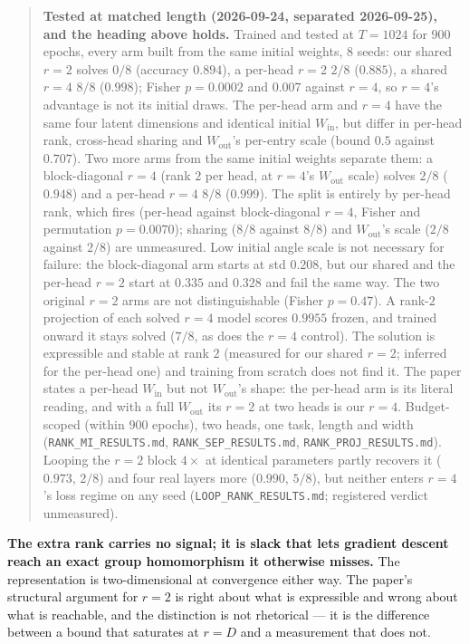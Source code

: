 \documentclass[11pt]{article}
\begin{document}
\begin{quote}\small
\textbf{Tested at matched length (2026-09-24, separated 2026-09-25), and the heading above holds.} Trained
and tested at $T=1024$ for $900$ epochs, every arm built from the same initial
weights, $8$ seeds: our shared $r=2$ solves $0/8$ (accuracy $0.894$), a
per-head $r=2$ $2/8$ ($0.885$), a shared $r=4$ $8/8$ ($0.998$); Fisher $p=0.0002$ and
$0.007$ against $r=4$, so $r=4$'s advantage is not its initial draws. The per-head arm
and $r=4$ have the same four latent dimensions and identical initial
$W_{\mathrm{in}}$, but differ in per-head rank, cross-head sharing and
$W_{\mathrm{out}}$'s per-entry scale (bound $0.5$ against $0.707$). Two more arms from
the same initial weights separate them: a block-diagonal $r=4$ (rank $2$ per head, at
$r=4$'s $W_{\mathrm{out}}$ scale) solves $2/8$ ($0.948$) and a per-head $r=4$ $8/8$
($0.999$). The split is entirely by per-head rank, which fires (per-head against
block-diagonal $r=4$, Fisher and permutation $p=0.0070$); sharing ($8/8$ against $8/8$)
and $W_{\mathrm{out}}$'s scale ($2/8$ against $2/8$) are unmeasured. Low initial angle
scale is not necessary for failure: the block-diagonal arm starts at std $0.208$, but our
shared and the per-head $r=2$ start at $0.335$ and $0.328$ and fail the same way. The two
original $r=2$ arms are not distinguishable (Fisher $p=0.47$). A rank-$2$ projection of each solved $r=4$ model scores $0.9955$ frozen,
and trained onward it stays solved ($7/8$, as does the $r=4$ control). The solution
is expressible and stable at rank $2$ (measured for our shared $r=2$; inferred for
the per-head one) and training from scratch does not find it. The paper states a
per-head $W_{\mathrm{in}}$ but not $W_{\mathrm{out}}$'s shape: the per-head arm is
its literal reading, and with a full $W_{\mathrm{out}}$ its $r=2$ at two heads is our
$r=4$. Budget-scoped (within $900$ epochs), two heads, one task, length and width
(\texttt{RANK\_MI\_RESULTS.md}, \texttt{RANK\_SEP\_RESULTS.md}, \texttt{RANK\_PROJ\_RESULTS.md}).
Looping the $r=2$ block $4\times$ at identical parameters partly recovers it ($0.973$,
$2/8$) and four real layers more ($0.990$, $5/8$), but neither enters $r=4$'s loss regime
on any seed (\texttt{LOOP\_RANK\_RESULTS.md}; registered verdict unmeasured).
\end{quote}

\textbf{The extra rank carries no signal; it is slack that lets gradient descent
reach an exact group homomorphism it otherwise misses.} The representation is
two-dimensional at convergence either way. The paper's structural argument for
$r=2$ is right about what is expressible and wrong about what is reachable, and
the distinction is not rhetorical --- it is the difference between a bound that
saturates at $r=D$ and a measurement that does not.
\end{document}

